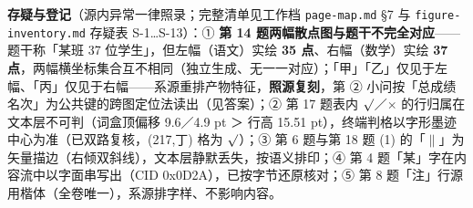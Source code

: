 \begin{gktip}
\textbf{存疑与登记}（源内异常一律照录；完整清单见工作档 \texttt{page-map.md} §7 与 \texttt{figure-inventory.md} 存疑表 S-1…S-13）：① \textbf{第 14 题两幅散点图与题干不完全对应}——题干称「某班 37 位学生」，但左幅（语文）实绘 \textbf{35 点}、右幅（数学）实绘 \textbf{37 点}，两幅横坐标集合互不相同（独立生成、无一一对应）；「甲」「乙」仅见于左幅、「丙」仅见于右幅——系源重排产物特征，\textbf{照源复刻}，第 ② 小问按「总成绩名次」为公共键的跨图定位法读出（见答案）；② 第 17 题表内 \(\surd\)／\(\times\) 的行归属在文本层不可判（词盒顶偏移 9.6／4.9 pt ＞ 行高 15.51 pt），终端判格以字形墨迹中心为准（已双路复核，(217,丁) 格为 \(\surd\)）；③ 第 6 题与第 18 题 (1) 的「$\parallel$」为矢量描边（右倾双斜线），文本层静默丢失，按语义排印；④ 第 4 题「某」字在内容流中以字面串写出（CID 0x0D2A），已按字节还原核对；⑤ 第 8 题「注」行源用楷体（全卷唯一），系源排字样、不影响内容。
\end{gktip}



